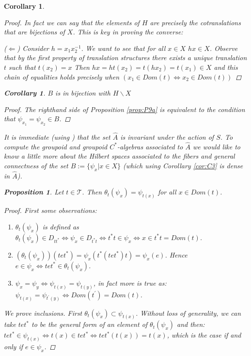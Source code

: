 \documentclass[11pt]{amsart}
\theoremstyle{plain}
\newtheorem{proposition}[theorem]{Proposition}%
\newtheorem{corollary}[theorem]{Corollary}%
\theoremstyle{definition}%
\theoremstyle{remark}%
\newcommand{\A}{\widehat{A}}
\begin{document}
\begin{corollary}
\begin{proof}
In fact we can say that the elements of $H$ are precisely the cotranslations that are bijections of $X$. This is key in proving the converse:

($\Leftarrow$) Consider $h=x_{1}x_{2}^{-1}$. We want to see that for all $x \in X$ $hx \in X$. Observe that by the first property of translation structures there exists a unique translation $t$ such that $t(x_{2})=x$ Then $hx=ht(x_{2})=t(hx_{2})=t(x_{1}) \in X$ and this chain of equalities holds precisely when $(x_{1} \in Dom(t) \Leftrightarrow x_{2} \in Dom(t))$

\end{proof}

\begin{corollary}\label{cor:C5}
$B$ is in bijection with $H \backslash X$
\end{corollary}
\begin{proof}
The righthand side of Proposition \ref{prop:P9a} is equivalent to the condition that $\psi_{x_{1}}=\psi_{x_{2}} \in B$.
\end{proof}

It is immediate (using \cite[Prop 10.10]{MR2419901}) that the set $\A$ is invariant under the action of $S$. To compute the groupoid and groupoid $C^{*}$-algebras associated to $\A$ we would like to know a little more about the Hilbert spaces associated to the fibers and general connectness of the set $B:=\lbrace \psi_{x} | x \in X \rbrace$ (which using Corollary \ref{cor:C3} is dense in $\A$).

\begin{proposition}\label{prop:P10}
Let $t \in \mathcal{T}$. Then $\theta_{t}(\psi_{x})=\psi_{t(x)}$ for all $x \in Dom(t)$.
\end{proposition}
\begin{proof}
First some observations:
\begin{enumerate}
\item $\theta_{t}(\psi_{x})$ is defined as $\theta_{t}(\psi_{x}) \in D_{tt^{*}} \Leftrightarrow \psi_{x} \in D_{t^{*}t} \Leftrightarrow t^{*}t \in \psi_{x} \Leftrightarrow x \in t^{*}t = Dom(t)$.
\item $(\theta_{t}(\psi_{x}))(tet^{*})=\psi_{x}(t^{*}(tet^{*})t)=\psi_{x}(e)$. Hence $e \in \psi_{x} \Leftrightarrow tet^{*}  \in \theta_{t}(\psi_{x})$.
\item $\psi_{x}=\psi_{y} \Leftrightarrow \psi_{t(x)}=\psi_{t(y)}$, in fact more is true as: $\psi_{t(x)}=\psi_{t^{'}(y)} \Leftrightarrow Dom(t^{'})=Dom(t)$.
\end{enumerate}
We prove inclusions. First $\theta_{t}(\psi_{x}) \subset \psi_{t(x)}$. Without loss of generality, we can take $tet^{*}$ to be the general form of an element of $\theta_{t}(\psi_{x})$ and then: $tet^{*} \in \psi_{t(x)} \Leftrightarrow t(x) \in tet^{*} \Leftrightarrow tet^{*}(t(x))=t(x)$, which is the case if and only if $e \in \psi_{x}$.


\end{proof}
\end{corollary}
\end{document}
